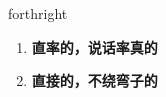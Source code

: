 
\begin{frame}
{\huge forthright}
\begin{center}
\begin{enumerate}\Large
  \item \textbf{直率的，说话率真的}
  \item \textbf{直接的，不绕弯子的}
\end{enumerate}
\end{center}
\end{frame}
